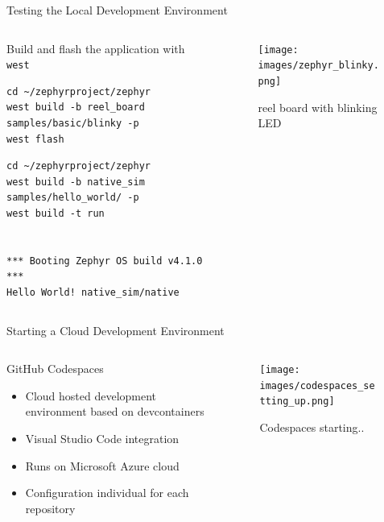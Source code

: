 \documentclass[10pt, aspectratio=169]{beamer}
\begin{document}
\begin{frame}[fragile]{Testing the Local Development Environment}
  \begin{columns}
    \begin{column}{0.6\textwidth}
    Build and flash the application with \texttt{west}
    \begin{verbatim}
cd ~/zephyrproject/zephyr
west build -b reel_board samples/basic/blinky -p
west flash
    \end{verbatim}
    \begin{verbatim}
cd ~/zephyrproject/zephyr
west build -b native_sim samples/hello_world/ -p
west build -t run


*** Booting Zephyr OS build v4.1.0 ***
Hello World! native_sim/native
    \end{verbatim}
    \end{column}
    \begin{column}{0.4\textwidth}
      \begin{figure}
        \texttt{[image: images/zephyr\_blinky.png]}
        \caption*{reel board with blinking LED}
      \end{figure}
    \end{column}
  \end{columns}
\end{frame}
\begin{frame}[fragile]{Starting a Cloud Development Environment}
  \begin{columns}
    \begin{column}{0.6\textwidth}
    GitHub Codespaces \footnotemark
    \begin{itemize}
      \item Cloud hosted development environment based on devcontainers
      \item Visual Studio Code integration
      \item Runs on Microsoft Azure cloud
      \item Configuration individual for each repository
    \end{itemize}
    \end{column}
    \begin{column}{0.4\textwidth}
      \begin{figure}
        \texttt{[image: images/codespaces\_setting\_up.png]}
        \caption*{Codespaces starting..}
      \end{figure}
    \end{column}
  \end{columns}
\end{frame}
\end{document}
